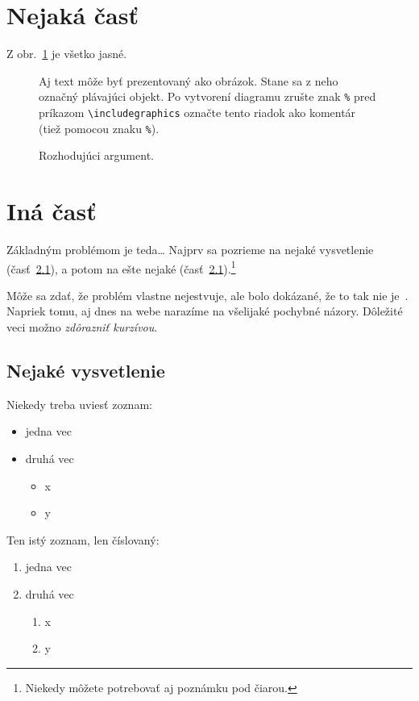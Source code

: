 \documentclass[10pt,twocolumn,twoside,slovak,a4paper]{report} %
\begin{document}
\section{Nejaká časť} \label{nejaka}

Z obr.~\ref{f:rozhod} je všetko jasné. 

\begin{figure}[tbh]
\centering
Aj text môže byť prezentovaný ako obrázok. Stane sa z neho označný plávajúci objekt. Po vytvorení diagramu zrušte znak \texttt{\%} pred príkazom \verb|\includegraphics| označte tento riadok ako komentár (tiež pomocou znaku \texttt{\%}).
\caption{Rozhodujúci argument.}
\label{f:rozhod}
\end{figure}


\section{Iná časť} \label{ina}

Základným problémom je teda\ldots{} Najprv sa pozrieme na nejaké vysvetlenie (časť~\ref{ina:nejake}), a potom na ešte nejaké (časť~\ref{ina:nejake}).\footnote{Niekedy môžete potrebovať aj poznámku pod čiarou.}

Môže sa zdať, že problém vlastne nejestvuje\cite{Coplien:MPD}, ale bolo dokázané, že to tak nie je~\cite{Czarnecki:Staged, Czarnecki:Progress}. Napriek tomu, aj dnes na webe narazíme na všelijaké pochybné názory\cite{PLP-Framework}. Dôležité veci možno \emph{zdôrazniť kurzívou}.


\subsection{Nejaké vysvetlenie} \label{ina:nejake}

Niekedy treba uviesť zoznam:

\begin{itemize}
\item jedna vec
\item druhá vec
	\begin{itemize}
	\item x
	\item y
	\end{itemize}
\end{itemize}

Ten istý zoznam, len číslovaný:

\begin{enumerate}
\item jedna vec
\item druhá vec
	\begin{enumerate}
	\item x
	\item y
	\end{enumerate}
\end{enumerate}
\end{document}
